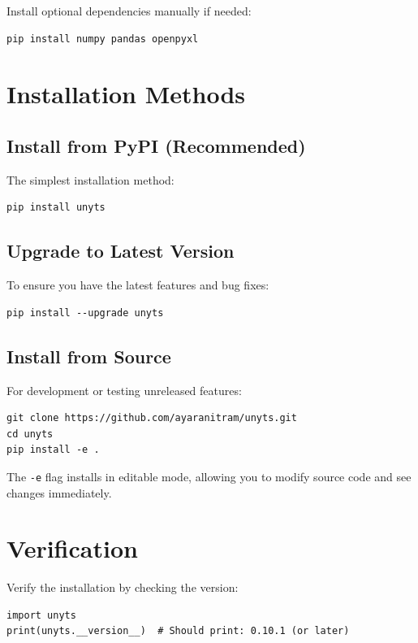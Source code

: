 \documentclass[11pt,a4paper]{report}
\begin{document}
Install optional dependencies manually if needed:
\begin{lstlisting}[style=bashstyle]
pip install numpy pandas openpyxl
\end{lstlisting}

\section{Installation Methods}

\subsection{Install from PyPI (Recommended)}

The simplest installation method:
\begin{lstlisting}[style=bashstyle]
pip install unyts
\end{lstlisting}

\subsection{Upgrade to Latest Version}

To ensure you have the latest features and bug fixes:
\begin{lstlisting}[style=bashstyle]
pip install --upgrade unyts
\end{lstlisting}

\subsection{Install from Source}

For development or testing unreleased features:
\begin{lstlisting}[style=bashstyle]
git clone https://github.com/ayaranitram/unyts.git
cd unyts
pip install -e .
\end{lstlisting}

The \texttt{-e} flag installs in editable mode, allowing you to modify source code and see changes immediately.

\section{Verification}

Verify the installation by checking the version:

\begin{lstlisting}[style=pythonstyle]
import unyts
print(unyts.__version__)  # Should print: 0.10.1 (or later)
\end{lstlisting}
\end{document}
